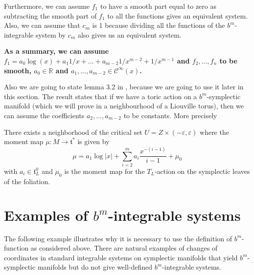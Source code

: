 Furthermore, we can assume $f_1$  to have a smooth part equal to zero as subtracting the smooth part of $f_1$ to all the functions gives an equivalent system.
Also, we can assume that $c_m$ is 1 because dividing all the functions of the $b^m$-integrable system by $c_m$ also gives us an equivalent system.


\textbf{As a summary, we can assume $f_1 = a_0 \log(x) + a_1 1/x + \ldots + a_{m-2}1/x^{m-2} + 1/x^{m-1}$ and $f_2, \ldots, f_n$ to be smooth, $a_0\in \mathbb{R}$ and $a_1, \ldots, a_{m-2} \in \mathcal{C}^\infty(x)$.}

Also we are going to state lemma 3.2 in \cite{GMP17}, because we are going to use it later in this section. The result states that if we have a toric action on a $b^m$-symplectic manifold (which we will prove in a neighbourhood of a Liouville torus), then we can assume the coefficients $a_2, \ldots, a_{m-2}$ to be constants. More precisely

\begin{lemma}\label{lemma:ctt_coefs}
There exists a neighborhood of the critical set $U = Z\times (-\varepsilon, \varepsilon)$ where the moment map $\mu: M \rightarrow \mathfrak{t}^*$ is given by
$$\mu = a_1 \log|x| + \sum_{i=2}^{m}a_i \frac{x^{-(i-1)}}{i-1} + \mu_0$$
with $a_i \in \mathfrak{t}^0_L$ and $\mu_0$ is the moment map for the $T_L$-action on the symplectic leaves of the foliation.
\end{lemma}


\section{Examples of $b^m$-integrable systems}

The following example illustrates why it is necessary to use the definition of $b^m$-function as considered above. There are natural examples of changes of coordinates in standard integrable systems on symplectic manifolds that yield  $b^m$-symplectic manifolds but do not give well-defined $b^m$-integrable systems.

